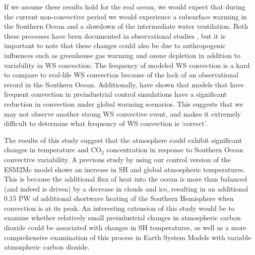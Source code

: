 If we assume these results hold for the real ocean, we would expect that during
the current non-convective period we would experience a subsurface warming in the Southern
Ocean and a slowdown of the intermediate water ventilation. Both these processes
have been documented in observational studies \citep{Purkey2012,Waugh2013b}, but
it is important to note that these changes could also be due to anthropogenic influences
such as greenhouse gas warming and ozone depletion in addition to variability in
WS convection.
The frequency of modeled WS convection is a hard to compare to real-life WS
convection because of the lack of an observational record in the Southern Ocean.
Additionally, \citet{DeLavergne2014a}
have shown that models that have frequent convection in preindustrial control
simulations have a significant reduction in convection under global warming
scenarios. This suggests that we may not observe another strong WS convective event,
and makes it extremely difficult to determine what frequency of WS convection is
`correct'.

The results of this study suggest that the atmosphere could exhibit significant
changes in temperature and CO$_2$ concentration in response to Southern Ocean
convective variability. A previous study by \citet{Cabre} using our
control version of the ESM2Mc model shows an increase in SH and global atmospheric
temperatures. This is because the additional flux of heat into the ocean is more
than balanced (and indeed is driven) by a decrease in clouds and ice, resulting
in an additional 0.15 PW of additional shortwave heating of the Southern Hemisphere
when convection is at its peak. An interesting extension of this
study would be to examine whether relatively small preindustrial changes in
atmospheric carbon dioxide could be associated with changes in SH temperatures,
as well as a more comprehensive examination of this process in Earth System
Models with variable atmospheric carbon dioxide.

